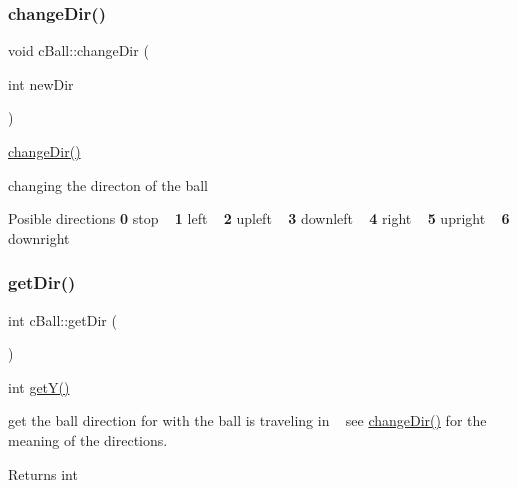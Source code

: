 \subsubsection{\texorpdfstring{change\+Dir()}{changeDir()}}
{\footnotesize\ttfamily void c\+Ball\+::change\+Dir (\begin{DoxyParamCaption}\item[{int}]{new\+Dir }\end{DoxyParamCaption})}



\mbox{\hyperlink{classc_ball_a34a6133cf86c6a333ae9b14eef4d3f99}{change\+Dir()}} 

changing the directon of the ball

\begin{DoxyParagraph}{Posible directions}
{\bfseries 0} stop ~\newline
 {\bfseries 1} left ~\newline
 {\bfseries 2} upleft ~\newline
 {\bfseries 3} downleft ~\newline
 {\bfseries 4} right ~\newline
 {\bfseries 5} upright ~\newline
 {\bfseries 6} downright ~\newline
 
\end{DoxyParagraph}
\mbox{\label{classc_ball_aabb4c1b801ca98f18461f0abebd22e41}} 
\subsubsection{\texorpdfstring{get\+Dir()}{getDir()}}
{\footnotesize\ttfamily int c\+Ball\+::get\+Dir (\begin{DoxyParamCaption}{ }\end{DoxyParamCaption})}



int \mbox{\hyperlink{classc_ball_a4439db1ba25e8f69fde4fdf0fa1b4f24}{get\+Y()}} 

get the ball direction for with the ball is traveling in ~\newline
see \mbox{\hyperlink{classc_ball_a34a6133cf86c6a333ae9b14eef4d3f99}{change\+Dir()}} for the meaning of the directions.

\begin{DoxyReturn}{Returns}
int 
\end{DoxyReturn}
\mbox{\label{classc_ball_a6216240ba8780e2510c2d2eb5c792be0}} 
